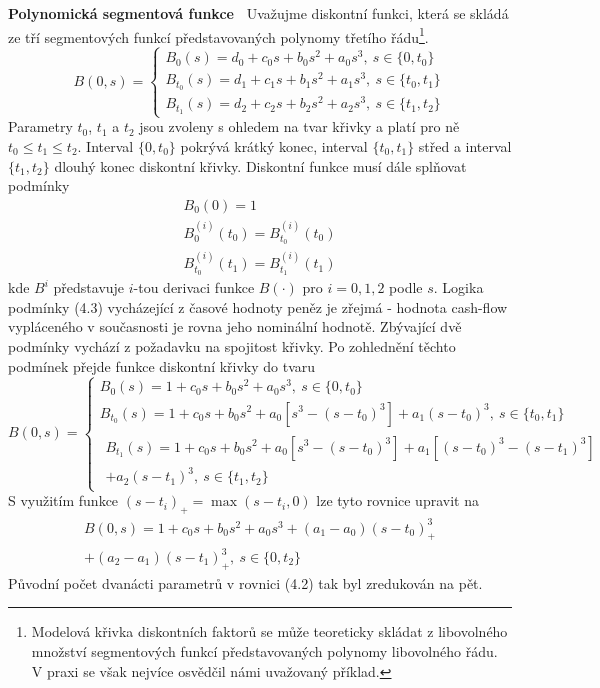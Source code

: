 \documentclass[a4paper]{book}
\begin{document}
\noindent \textbf{Polynomická segmentová funkce~} Uvažujme diskontní funkci, která se skládá ze tří segmentových funkcí představovaných polynomy třetího řádu\footnote{Modelová křivka diskontních faktorů se může teoreticky skládat z libovolného množství segmentových funkcí představovaných polynomy libovolného řádu. V praxi se však nejvíce osvědčil námi uvažovaný příklad.}.
\begin{equation}
B(0,s) =
\begin{cases}
B_{0}(s) = d_0 + c_0s + b_0s^2 + a_0s^3, ~ s \in \{0,t_0\}\\
B_{t_0}(s) = d_1 + c_1s + b_1s^2 + a_1s^3, ~ s \in \{t_0,t_1\}\\
B_{t_1}(s) = d_2 + c_2s + b_2s^2 + a_2s^3, ~ s \in \{t_1,t_2\}
\end{cases}
\end{equation}
Parametry $t_0$, $t_1$ a $t_2$ jsou zvoleny s ohledem na tvar křivky a platí pro ně $t_0 \le t_1 \le t_2$. Interval $\{0, t_0\}$ pokrývá krátký konec, interval $\{t_0, t_1\}$ střed a interval $\{t_1, t_2\}$ dlouhý konec diskontní křivky. Diskontní funkce musí dále splňovat podmínky
\begin{gather}
B_{0}(0) = 1 \\
B_{0}^{(i)}(t_0) = B_{t_0}^{(i)}(t_0) \\
B_{t_0}^{(i)}(t_1) = B_{t_1}^{(i)}(t_1)
\end{gather}
kde $B^{i}$ představuje $i$-tou derivaci funkce $B(\cdot)$ pro $i = 0, 1, 2$ podle $s$. Logika podmínky (4.3) vycházející z časové hodnoty peněz je zřejmá - hodnota cash-flow vypláceného v současnosti je rovna jeho nominální hodnotě. Zbývající dvě podmínky vychází z požadavku na spojitost křivky. Po zohlednění těchto podmínek přejde funkce diskontní křivky do tvaru
\begin{equation*}
B(0,s) =
\begin{cases}
B_{0}(s) = 1 + c_0s + b_0s^2 + a_0s^3, ~ s \in \{0,t_0\}\\
B_{t_0}(s) = 1 + c_0s + b_0s^2 + a_0[s^3 - (s - t_0)^3] + a_1(s - t_0)^3, ~ s \in \{t_0,t_1\}\\
\begin{split} B_{t_1}(s) = 1 + c_0s + b_0s^2 + a_0[s^3 - (s - t_0)^3]  + a_1[(s - t_0)^3 - (s - t_1)^3]\\ + a_2(s - t_1)^3, ~ s \in \{t_1,t_2\} \end{split}
\end{cases}
\end{equation*}
S využitím funkce $(s - t_i)_{+} = \max(s - t_i, 0)$ lze tyto rovnice upravit na
\begin{equation}
\begin{split}
B(0,s) = 1 + c_0s + b_0s^2 + a_0s^3 + (a_1 - a_0)(s - t_0)_{+}^3 \\
+ (a_2 - a_1)(s - t_1)_{+}^3, ~ s \in \{0, t_2\}
\end{split}
\end{equation}
Původní počet dvanácti parametrů v rovnici (4.2) tak byl zredukován na pět.\\
\end{document}
